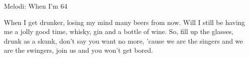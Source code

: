 \begin{song}

\begin{songmeta}
Melodi: When I'm 64
\end{songmeta}

\begin{songtext}
When I get drunker, losing my mind
many beers from now.
Will I still be having me a jolly good time,
whisky, gin and a bottle of wine.
So, fill up the glasses, drunk as a skunk,
don't say you want no more,
'cause we are the singers
and we are the swingers,
join us and you won't get bored.
\end{songtext}

\end{song}
